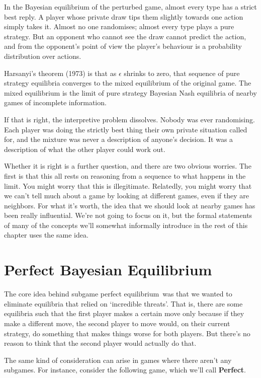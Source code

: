 \documentclass[
  11pt,
  letterpaper,
]{scrbook}
\begin{document}
In the Bayesian equilibrium of the perturbed game, almost every type has
a strict best reply. A player whose private draw tips them slightly
towards one action simply takes it. Almost no one randomises; almost
every type plays a pure strategy. But an opponent who cannot see the
draw cannot predict the action, and from the opponent's point of view
the player's behaviour is a probability distribution over actions.

Harsanyi's theorem (1973) is that as \(\epsilon\) shrinks to zero, that
sequence of pure strategy equilibria converges to the mixed equilibrium
of the original game. The mixed equilibrium is the limit of pure
strategy Bayesian Nash equilibria of nearby games of incomplete
information.

If that is right, the interpretive problem dissolves. Nobody was ever
randomising. Each player was doing the strictly best thing their own
private situation called for, and the mixture was never a description of
anyone's decision. It was a description of what the other player could
work out.

Whether it is right is a further question, and there are two obvious
worries. The first is that this all rests on reasoning from a sequence
to what happens in the limit. You might worry that this is illegitimate.
Relatedly, you might worry that we can't tell much about a game by
looking at different games, even if they are neighbors. For what it's
worth, the idea that we should look at nearby games has been really
influential. We're not going to focus on it, but the formal statements
of many of the concepts we'll somewhat informally introduce in the rest
of this chapter uses the same idea.

\section{Perfect Bayesian Equilibrium}\label{sec-pbe}

The core idea behind subgame perfect equilibrium~was that we wanted to
eliminate equilibria that relied on `incredible threats'. That is, there
are some equilibria such that the first player makes a certain move only
because if they make a different move, the second player to move would,
on their current strategy, do something that makes things worse for both
players. But there's no reason to think that the second player would
actually do that.

The same kind of consideration can arise in games where there aren't any
subgames. For instance, consider the following game, which we'll call
\textbf{Perfect}.
\end{document}

